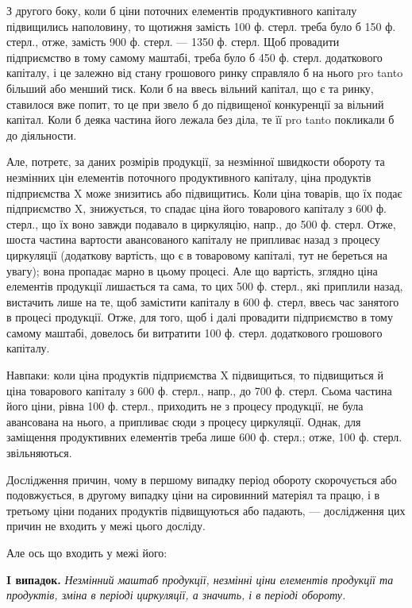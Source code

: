 З другого боку, коли б ціни поточних елементів продуктивного капіталу
підвищились наполовину, то щотижня замість 100 ф. стерл. треба
було б 150 ф. стерл., отже, замість 900 ф. стерл. — 1350 ф. стерл. Щоб
провадити підприємство в тому самому маштабі, треба було б 450 ф.
стерл. додаткового капіталу, і це залежно від стану грошового ринку
справляло б на нього pro tanto більший або менший тиск. Коли б на
ввесь вільний капітал, що є та ринку, ставилося вже попит, то це при
звело б до підвищеної конкуренції за вільний капітал. Коли б деяка частина
його лежала без діла, те її pro tanto покликали б до діяльности.

Але, потретє, за даних розмірів продукції, за незмінної швидкости
обороту та незмінних цін елементів поточного продуктивного капіталу,
ціна продуктів підприємства X може знизитись або підвищитись. Коли
ціна товарів, що їх подає підприємство X, знижується, то спадає ціна
його товарового капіталу з 600 ф. стерл., що їх воно завжди подавало
в циркуляцію, напр., до 500 ф. стерл. Отже, шоста частина вартости авансованого
капіталу не припливає назад з процесу циркуляції (додаткову вартість,
що є в товаровому капіталі, тут не береться на увагу); вона пропадає
марно в цьому процесі. Але що вартість, зглядно ціна елементів продукції
лишається та сама, то цих 500 ф. стерл., які приплили назад, вистачить
лише на те, щоб замістити  капіталу в 600 ф. стерл, ввесь час
занятого в процесі продукції. Отже, для того, щоб і далі провадити підприємство
в тому самому маштабі, довелось би витратити 100 ф. стерл.
додаткового грошового капіталу.

Навпаки: коли ціна продуктів підприємства X підвищиться, то підвищиться
й ціна товарового капіталу з 600 ф. стерл., напр., до 700 ф.
стерл. Сьома частина його ціни, рівна 100 ф. стерл., приходить не з
процесу продукції, не була авансована на нього, а припливає сюди з
процесу циркуляції. Однак, для заміщення продуктивних елементів треба
лише 600 ф. стерл.; отже, 100 ф. стерл. звільняються.

Дослідження причин, чому в першому випадку період обороту
скорочується або подовжується, в другому випадку ціни на сировинний
матеріял та працю, і в третьому ціни поданих продуктів підвищуються
або падають, — дослідження цих причин не входить у межі цього досліду.

Але ось що входить у межі його:

\textbf{I випадок.} \emph{Незмінний маштаб продукції, незмінні ціни елементів
продукції та продуктів, зміна в періоді циркуляції, а значить, і в періоді
обороту.}

